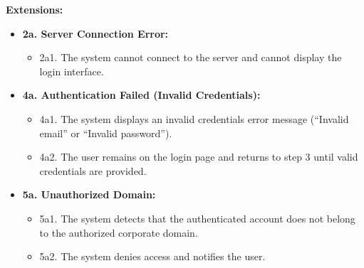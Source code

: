 \vspace{0.3cm}

\textbf{Extensions:}

\begin{itemize} [label={}, leftmargin=0.75cm, noitemsep]
    \item \textbf{2a. Server Connection Error:}
    \begin{itemize} [label={}, leftmargin=0.75cm, noitemsep]
        \item 2a1. The system cannot connect to the server and cannot display the login interface.
    \end{itemize}

    \item \textbf{4a. Authentication Failed (Invalid Credentials):}
    \begin{itemize} [label={}, leftmargin=0.75cm, noitemsep]
        \item 4a1. The system displays an invalid credentials error message (``Invalid email'' or ``Invalid password'').
        \item 4a2. The user remains on the login page and returns to step 3 until valid credentials are provided.
    \end{itemize}

    \item \textbf{5a. Unauthorized Domain:}
    \begin{itemize}  [label={}, leftmargin=0.75cm, noitemsep]
        \item 5a1. The system detects that the authenticated account does not belong to the authorized corporate domain.
        \item 5a2. The system denies access and notifies the user.
    \end{itemize}
\end{itemize}


